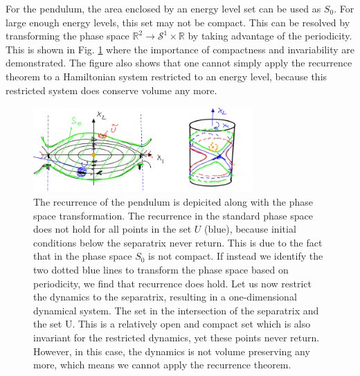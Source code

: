 \begin{ex}
	For the pendulum, the area enclosed by an energy level set can be used as $S_0$. For large enough energy levels, this set may not be compact. This can be resolved by transforming the phase space $\mathbb{R}^{2}\to \mathcal{S}^{1}\times \mathbb{R}$ by taking advantage of the periodicity. This is shown in Fig. \ref{fig:pendulum_recurrence} where the importance of compactness and invariability are demonstrated. The figure also shows that one cannot simply apply the recurrence theorem to a Hamiltonian system restricted to an energy level, because this restricted system does conserve volume any more.  
	\begin{figure}[h!]
		\centering
		\includegraphics[width=0.75\textwidth]{figures/ch8/12pendulum_recurrence.png}
		\caption{The recurrence of the pendulum is depicited along with the phase space transformation. The recurrence in the standard phase space does not hold for all points in the set $U$ (blue), because initial conditions below the separatrix never return. This is due to the fact that in the phase space $S_0$ is not compact. If instead we identify the two dotted blue lines to transform the phase space based on periodicity, we find that recurrence does hold. Let us now restrict the dynamics to the separatrix, resulting in a one-dimensional dynamical system. The set in the intersection of the separatrix and the set U. This is a relatively open and compact set which is also invariant for the restricted dynamics, yet these points never return. However, in this case, the dynamics is not volume preserving any more, which means we cannot apply the recurrence theorem.}
		\label{fig:pendulum_recurrence}
	\end{figure}
\end{ex}


